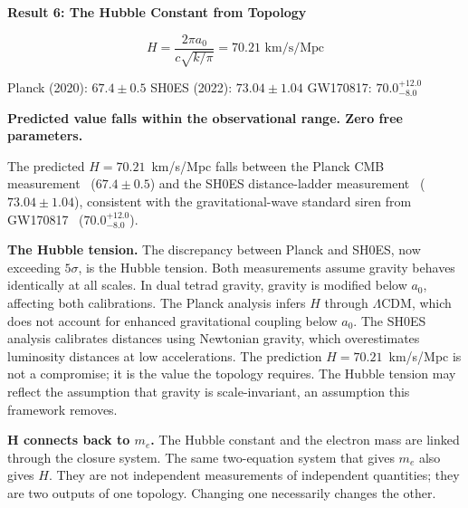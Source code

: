 \documentclass[aps,prd,preprint,superscriptaddress,showpacs,preprintnumbers,amsmath,amssymb,nofootinbib]{revtex4-2}
\begin{document}
\vspace{1em}
\noindent
\colorbox{resultgreen}{\parbox{\dimexpr\textwidth-2\fboxsep\relax}{%
\vspace{0.8em}
\centering
\textbf{\large Result 6: The Hubble Constant from Topology}

\vspace{0.5em}
\boldmath
\begin{equation}
H = \frac{2\pi a_0}{c\sqrt{k/\pi}} = 70.21 \text{ km/s/Mpc}
\label{eq:hubble-result}
\end{equation}
\unboldmath

\vspace{0.3em}
Planck (2020): $\bm{67.4 \pm 0.5}$ \quad SH0ES (2022): $\bm{73.04 \pm 1.04}$ \quad GW170817: $\bm{70.0^{+12.0}_{-8.0}}$

\textbf{Predicted value falls within the observational range. Zero free parameters.}
\vspace{0.5em}
}}
\vspace{1em}

The predicted $H = 70.21$~km/s/Mpc falls between the Planck CMB measurement~\cite{planck2020} ($67.4 \pm 0.5$) and the SH0ES distance-ladder measurement~\cite{riess2022} ($73.04 \pm 1.04$), consistent with the gravitational-wave standard siren from GW170817~\cite{gw170817} ($70.0^{+12.0}_{-8.0}$).

\textbf{The Hubble tension.} The discrepancy between Planck and SH0ES, now exceeding $5\sigma$, is the Hubble tension. Both measurements assume gravity behaves identically at all scales. In dual tetrad gravity, gravity is modified below $a_0$, affecting both calibrations. The Planck analysis infers $H$ through $\Lambda$CDM, which does not account for enhanced gravitational coupling below $a_0$. The SH0ES analysis calibrates distances using Newtonian gravity, which overestimates luminosity distances at low accelerations. The prediction $H = 70.21$~km/s/Mpc is not a compromise; it is the value the topology requires. The Hubble tension may reflect the assumption that gravity is scale-invariant, an assumption this framework removes.

\textbf{H connects back to $m_e$.} The Hubble constant and the electron mass are linked through the closure system. The same two-equation system that gives $m_e$ also gives $H$. They are not independent measurements of independent quantities; they are two outputs of one topology. Changing one necessarily changes the other.

\end{document}
